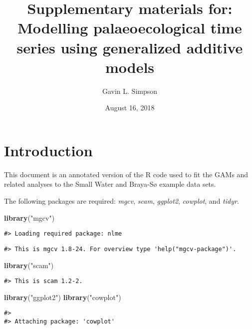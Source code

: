 \documentclass[12pt,]{article}
\title{Supplementary materials for: Modelling palaeoecological time series
using generalized additive models}
\author{Gavin L. Simpson}
\date{August 16, 2018}
\newenvironment{Shaded}{\begin{snugshade}}{\end{snugshade}}
\newcommand{\KeywordTok}[1]{\textcolor[rgb]{0.13,0.29,0.53}{\textbf{{#1}}}}
\newcommand{\StringTok}[1]{\textcolor[rgb]{0.31,0.60,0.02}{{#1}}}
\newcommand{\NormalTok}[1]{{#1}}
\begin{document}
\maketitle

\section{Introduction}\label{introduction}

This document is an annotated version of the R code used to fit the GAMs
and related analyses to the Small Water and Braya-Sø example data sets.

The following packages are required: \emph{mgcv}, \emph{scam},
\emph{ggplot2}, \emph{cowplot}, and \emph{tidyr}.

\begin{Shaded}
\begin{Highlighting}[]
\KeywordTok{library}\NormalTok{(}\StringTok{"mgcv"}\NormalTok{)}
\end{Highlighting}
\end{Shaded}

\begin{verbatim}
#> Loading required package: nlme
\end{verbatim}

\begin{verbatim}
#> This is mgcv 1.8-24. For overview type 'help("mgcv-package")'.
\end{verbatim}

\begin{Shaded}
\begin{Highlighting}[]
\KeywordTok{library}\NormalTok{(}\StringTok{"scam"}\NormalTok{)}
\end{Highlighting}
\end{Shaded}

\begin{verbatim}
#> This is scam 1.2-2.
\end{verbatim}

\begin{Shaded}
\begin{Highlighting}[]
\KeywordTok{library}\NormalTok{(}\StringTok{"ggplot2"}\NormalTok{)}
\KeywordTok{library}\NormalTok{(}\StringTok{"cowplot"}\NormalTok{)}
\end{Highlighting}
\end{Shaded}

\begin{verbatim}
#> 
#> Attaching package: 'cowplot'
\end{verbatim}
\end{document}
